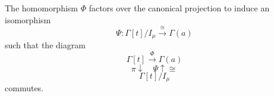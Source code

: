 The homomorphism $\Phi$ factors over the canonical projection to induce an isomorphism
$$\Psi: \Gamma[t] / I_{\mu} \xrightarrow{\cong} \Gamma(a)$$
such that the diagram
$$\Gamma[t] \xrightarrow{\Phi} \Gamma(a)$$
$$\pi \downarrow \quad \Psi \uparrow \cong$$
$$\Gamma[t] / I_{\mu}$$
commutes.
